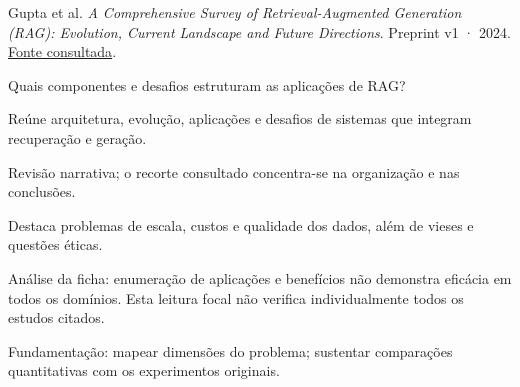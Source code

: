 {\small Gupta et al. \textit{A Comprehensive Survey of Retrieval-Augmented Generation (RAG): Evolution, Current Landscape and Future Directions}. Preprint v1 · 2024. \href{https://arxiv.org/pdf/2410.12837v1}{Fonte consultada}.\par}

Quais componentes e desafios estruturam as aplicações de RAG?

Reúne arquitetura, evolução, aplicações e desafios de sistemas que integram recuperação e geração.

Revisão narrativa; o recorte consultado concentra-se na organização e nas conclusões.

Destaca problemas de escala, custos e qualidade dos dados, além de vieses e questões éticas.

\begin{itemize}
\end{itemize}

Análise da ficha: enumeração de aplicações e benefícios não demonstra eficácia em todos os domínios. Esta leitura focal não verifica individualmente todos os estudos citados.

Fundamentação: mapear dimensões do problema; sustentar comparações quantitativas com os experimentos originais.

